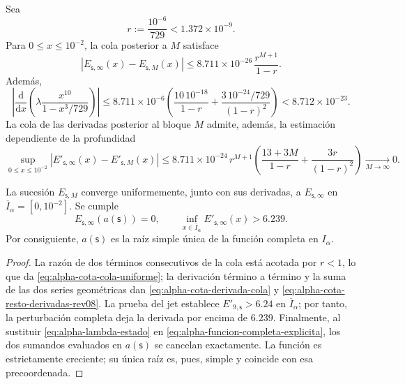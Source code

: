 Sea
\[
 r:=\frac{10^{-6}}{729}<1.372\mathbin{\times}10^{-9}.
\]
Para \(0\leq x\leq10^{-2}\), la cola posterior a \(M\) satisface
\begin{equation}
 \left|E_{\mathsf s,\infty}(x)-E_{\mathsf s,M}(x)\right|
 \leq
 8.711\mathbin{\times}10^{-26}\,\frac{r^{M+1}}{1-r}.
 \label{eq:alpha-cota-cola-uniforme}
\end{equation}
Además,
\begin{equation}
 \left|\frac{\mathrm d}{\mathrm dx}
  \left(\lambda\frac{x^{10}}{1-x^3/729}\right)\right|
 \leq 8.711\mathbin{\times}10^{-6}
 \left(\frac{10\,10^{-18}}{1-r}
 +\frac{3\,10^{-24}/729}{(1-r)^2}\right)
 <8.712\mathbin{\times}10^{-23}.
 \label{eq:alpha-cota-derivada-cola}
\end{equation}
La cola de las derivadas posterior al bloque \(M\) admite, además, la
estimación dependiente de la profundidad
\begin{equation}
 \sup_{0\le x\le10^{-2}}
 \left|E'_{\mathsf s,\infty}(x)-E'_{\mathsf s,M}(x)\right|
 \le 8.711\mathbin{\times}10^{-24}\,r^{M+1}
 \left(\frac{13+3M}{1-r}+\frac{3r}{(1-r)^2}\right)
 \xrightarrow[M\to\infty]{}0.
 \label{eq:alpha-cota-resto-derivadas-rev08}
\end{equation}

\begin{theorem}
\label{thm:alpha-raiz-completa-explicita}
La sucesión \(E_{\mathsf s,M}\) converge uniformemente, junto con sus
derivadas, a \(E_{\mathsf s,\infty}\) en
\(\overline I_\alpha=[0,10^{-2}]\). Se cumple
\begin{equation}
 E_{\mathsf s,\infty}(a(\mathsf s))=0,
 \qquad
 \inf_{x\in\overline I_\alpha}
 E'_{\mathsf s,\infty}(x)>6.239.
 \label{eq:alpha-raiz-y-derivada-completas}
\end{equation}
Por consiguiente, \(a(\mathsf s)\) es la raíz simple única de la función
completa en \(I_\alpha\).
\end{theorem}

\begin{proof}
La razón de dos términos consecutivos de la cola está acotada por \(r<1\),
lo que da \eqref{eq:alpha-cota-cola-uniforme}; la derivación término a
término y la suma de las dos series geométricas dan
\eqref{eq:alpha-cota-derivada-cola} y
\eqref{eq:alpha-cota-resto-derivadas-rev08}. La prueba del jet establece
\(E'_{9,\mathsf s}>6.24\) en \(\overline I_\alpha\); por tanto, la
perturbación completa deja la derivada por encima de \(6.239\).
Finalmente, al sustituir \eqref{eq:alpha-lambda-estado} en
\eqref{eq:alpha-funcion-completa-explicita}, los dos sumandos evaluados en
\(a(\mathsf s)\) se cancelan exactamente. La función es estrictamente
creciente; su única raíz es, pues, simple y coincide con esa precoordenada.
\end{proof}

